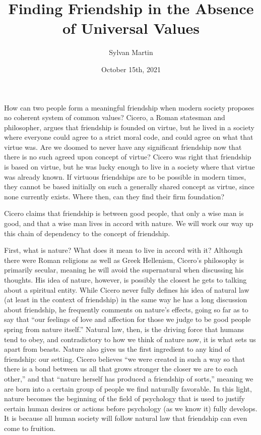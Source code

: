 \documentclass[12pt, letterpaper]{article}
\title{Finding Friendship in the Absence of Universal Values}
\author{Sylvan Martin}
\date{October 15th, 2021}
\begin{document}
\maketitle
\thispagestyle{empty}
\newpage

How can two people form a meaningful friendship when modern society proposes no coherent system of common values? 
Cicero, a Roman statesman and philosopher, argues that friendship is founded on virtue, but he lived in a 
society where everyone could agree to a strict moral code, and could agree on what that virtue was. Are we 
doomed to never have any significant friendship now that there is no such agreed upon concept of virtue? 
Cicero was right that friendship is based on virtue, but he was lucky enough to live in a society where that 
virtue was already known. If virtuous friendships are to be possible in modern times, they cannot be based 
initially on such a generally shared concept as virtue, since none currently exists. Where then, can they 
find their firm foundation?

Cicero claims that friendship is between good people, that only a wise man is good, and that a wise man lives 
in accord with nature.\autocite[sec. 18]{cicero} We will work our way up this chain of dependency to the concept of friendship.

First, what is nature? What does it mean to live in accord with it? Although there were Roman religions as 
well as Greek Hellenism, Cicero’s philosophy is primarily secular, meaning he will avoid the supernatural when
discussing his thoughts. His idea of nature, however, is possibly 
the closest he gets to talking about a spiritual entity. While Cicero never fully defines his idea of natural 
law (at least in the context of friendship) in the same way he has a long discussion about friendship, he frequently comments on nature’s effects, 
going so far as to say that “our feelings of love and affection for those we judge to be good people spring 
from nature itself.”\autocite[sec. 32]{cicero} Natural law, then, is the driving force that humans tend to obey, and contradictory to 
how we think of nature now, it is what sets us apart from beasts. Nature also gives us the first ingredient to any kind of 
friendship: our setting. Cicero believes “we were created in such a way so that there is a bond between us 
all that grows stronger the closer we are to each other,'' and that “nature herself has produced a friendship 
of sorts,”\autocite[sec. 19]{cicero} meaning we are born into a certain group of people we find naturally favorable. In this light, 
nature becomes the beginning of the field of psychology that is used to justify certain human desires or actions 
before psychology (as we know it) fully develops. It is because all human society will follow natural law that 
friendship can even come to fruition.
\end{document}
